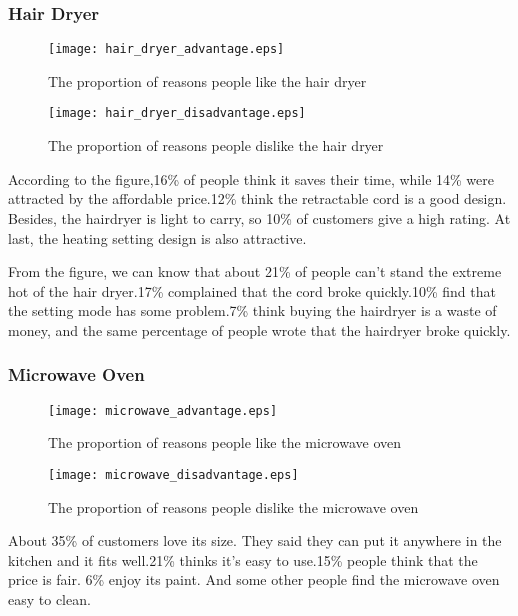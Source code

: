 \documentclass{mcmthesis}
\begin{document}
	
	\subsubsection{Hair Dryer}
	\begin{figure}[H]
		\begin{minipage}[t]{0.5\textwidth}
			\centering
			\texttt{[image: hair\_dryer\_advantage.eps]}
			\caption{The proportion of reasons people like the hair dryer}
		\end{minipage}
		\qquad
		\begin{minipage}[t]{0.5\textwidth}
			\centering
			\texttt{[image: hair\_dryer\_disadvantage.eps]}
			\caption{The proportion of reasons people dislike the hair dryer }
		\end{minipage}
	\end{figure}
	
	According to the figure,16\% of people think it saves their time, while 14\% were attracted by the affordable price.12\% think the retractable cord is a good design. Besides, the hairdryer is light to carry, so 10\% of customers give a high rating. At last, the heating setting design is also attractive.
	
	From the figure, we can know that about 21\% of people can't stand the extreme hot of the hair dryer.17\% complained that the cord broke quickly.10\% find that the setting mode has some problem.7\% think buying the hairdryer is a waste of money, and the same percentage of people wrote that the hairdryer broke quickly.
	
	\subsubsection{Microwave Oven}
	\begin{figure}[H]
		\begin{minipage}[t]{0.5\textwidth}
			\centering
			\texttt{[image: microwave\_advantage.eps]}
			\caption{The proportion of reasons people like the microwave oven\label{fig:1}}
		\end{minipage}
		\qquad
		\begin{minipage}[t]{0.5\textwidth}
			\centering
			\texttt{[image: microwave\_disadvantage.eps]}
			\caption{The proportion of reasons people dislike the microwave oven\label{fig:2}}
		\end{minipage}
	\end{figure}
	
	About 35\% of customers love its size. They said they can put it anywhere in the kitchen and it fits well.21\% thinks it's easy to use.15\% people think that the price is fair.
	6\% enjoy its paint. And some other people find the microwave oven easy to clean.
	
\end{document}
